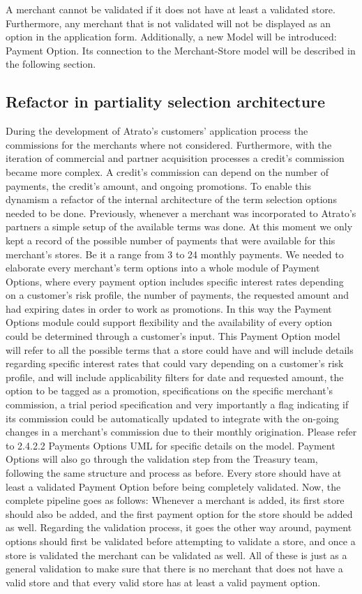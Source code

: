 A merchant cannot be validated if it does not have at least a validated store. Furthermore, any merchant that is not validated will not be displayed as an option in the application form.  Additionally, a new Model will be introduced: Payment Option. Its connection to the Merchant-Store model will be described in the following section.

\subsection{Refactor in partiality selection architecture}
During the development of Atrato’s customers’ application process the commissions for the merchants where not considered. Furthermore, with the iteration of commercial and partner acquisition processes a credit’s commission became more complex. A credit’s commission can depend on the number of payments, the credit’s amount, and ongoing promotions. To enable this dynamism a refactor of the internal architecture of the term selection options needed to be done.
Previously, whenever a merchant was incorporated to Atrato’s partners a simple setup of the available terms was done. At this moment we only kept a record of the possible number of payments that were available for this merchant’s stores. Be it a range from 3 to 24 monthly payments. We needed to elaborate every merchant’s term options into a whole module of Payment Options, where every payment option includes specific interest rates depending on a customer’s risk profile, the number of payments, the requested amount and had expiring dates in order to work as promotions. In this way the Payment Options module could support flexibility and the availability of every option could be determined through a customer’s input. 
This Payment Option model will refer to all the possible terms that a store could have and will include details regarding specific interest rates that could vary depending on a customer’s risk profile, and will include applicability filters for date and requested amount, the option to be tagged as a promotion, specifications on the specific merchant’s commission, a trial period specification and very importantly a flag indicating if its commission could be automatically updated to integrate with the on-going changes in a merchant’s commission due to their monthly origination. Please refer to 2.4.2.2 Payments Options UML for specific details on the model.
Payment Options will also go through the validation step from the Treasury team, following the same structure and process as before. Every store should have at least a validated Payment Option before being completely validated. Now, the complete pipeline goes as follows: 
Whenever a merchant is added, its first store should also be added, and the first payment option for the store should be added as well. Regarding the validation process, it goes the other way around, payment options should first be validated before attempting to validate a store, and once a store is validated the merchant can be validated as well. All of these is just as a general validation to make sure that there is no merchant that does not have a valid store and that every valid store has at least a valid payment option.
